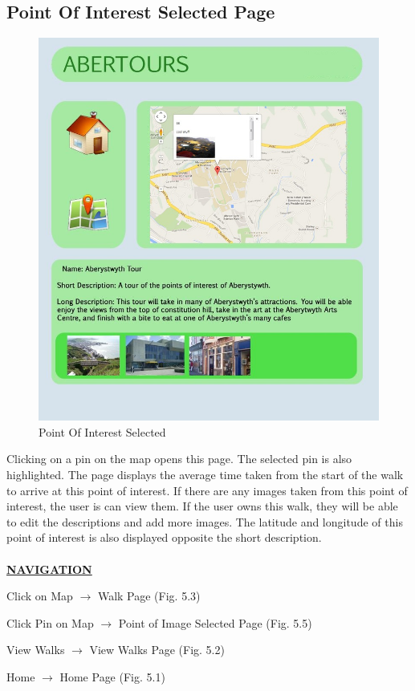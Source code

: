 \documentclass[12pt]{article}
\begin{document}
{\subsection{Point Of Interest Selected Page}

\begin{figure}[htp]
\centering
\includegraphics[scale=0.50]{Project_Plan/Web/new_map_copy2.jpg}
\caption{Point Of Interest Selected}
\label{Point Of Interest Selected}
\end{figure}
\par{Clicking on a pin on the map opens this page. The selected pin is also highlighted. The page displays the average time taken from the start of the walk to arrive at this point of interest. If there are any images taken from this point of interest, the user is can view them. If the user owns this walk, they will be able to edit the descriptions and add more images. The latitude and longitude of this point of interest is also displayed opposite the short description. \\ \\}
\textbf{\uline{NAVIGATION}}
\par{Click on Map $\rightarrow$ Walk Page (Fig. 5.3)}
\par{Click Pin on Map $\rightarrow$ Point of Image Selected Page (Fig. 5.5)}
\par{View Walks $\rightarrow$ View Walks Page (Fig. 5.2)}
\par{Home $\rightarrow$ Home Page (Fig. 5.1)}
\clearpage
}
\end{document}
